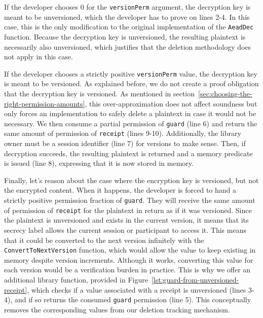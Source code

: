 If the developer chooses $0$ for the \texttt{versionPerm} argument, the decryption key is meant to be unversioned, which the developer has to prove on lines 2-4.
In this case, this is the only modification to the original implementation of the \texttt{AeadDec} function.
Because the decryption key is unversioned, the resulting plaintext is necessarily also unversioned, which justifies that the deletion methodology does not apply in this case.

If the developer chooses a strictly positive \texttt{versionPerm} value, the decryption key is meant to be versioned. 
As explained before, we do not create a proof obligation that the decryption key is versioned.
As mentioned in section~\ref{sec:choosing-the-right-permission-amounts}, this over-approximation does not affect soundness but only forces an implementation to safely delete a plaintext in case it would not be necessary.
We then consume a partial permission of \texttt{guard} (line 6) and return the same amount of permission of \texttt{receipt} (lines 9-10).
Additionally, the library owner must be a session identifier (line 7) for versions to make sense.
Then, if decryption succeeds, the resulting plaintext is returned and a memory predicate is issued (line 8), expressing that it is now stored in memory.

Finally, let's reason about the case where the encryption key is versioned, but not the encrypted content.
When it happens, the developer is forced to hand a strictly positive permission fraction of \texttt{guard}. 
They will receive the same amount of permission of \texttt{receipt} for the plaintext in return as if it was versioned.
Since the plaintext is unversioned and exists in the current version, it means that its secrecy label allows the current session or participant to access it.
This means that it could be converted to the next version infinitely with the \texttt{ConvertToNextVersion} function, which would allow the value to keep existing in memory despite version increments.
Although it works, converting this value for each version would be a verification burden in practice.
This is why we offer an additional library function, provided in Figure~\ref{lst:guard-from-unversioned-receipt}, which checks if a value associated with a receipt is unversioned (lines 3-4), and if so returns the consumed \texttt{guard} permission (line 5).
This conceptually removes the corresponding values from our deletion tracking mechanism.

